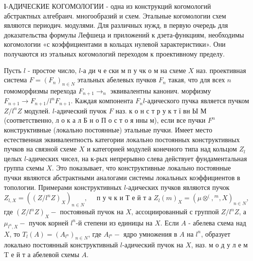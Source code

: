 \documentclass[10pt]{article}
\begin{document}
$\boldsymbol{l}$-АДИЧЕСКИЕ КОГОМОЛОГИИ - одна из конструкций когомологий абстрактных алгебраич. многообразий и схем. Этальные когомологии схем являются периодич. модулями. Для различных нужд, в первую очередь для доказательства формулы Лефшеца и приложений к дзета-функциям, необходимы когомологии «с коэффициентами в кольцах нулевой характеристики». Они получаются из этальных когомологий переходом к проективному пределу.



Пусть $l$ - простое число, $l$-а ди ч е ски м п у чк о м на схеме $X$ наз. проективная система $F=\left(F_{n}\right)_{n \in N}$ этальных абелевых пучков $F_{n}$ такая, что для всех $n$ гомоморфизмы перехода $F_{n+1} \rightarrow_{n}$ эквивалентны канонич. морфизму $F_{n+1} \rightarrow F_{n+1} / l^{n} F_{n+1}$. Каждая компонента $F_{n} l$-адического пучка является пучком $Z / l^{n} Z$ модулей. $l$-адический пучок $F$ наз. к о н с т р у к т ї вн Ы М (соответственно, л о к а л Б н о П о с т о я нны м), если все пучки $F^{n}$ конструктивные (локально постоянные) этальные пучки. Имеет место естественная эквивалентность категории локально постоянных конструктивных пучков на связной схеме $X$ и категорией модулей конечного типа над кольцом $Z_{l}$ целых $l$-адических чисел, на к-рых непрерывно слева действует фундаментальная группа схемы $X$. Это показывает, что конструктивные локально постоянные пучки являются абстрактными аналогами системы локальных коэффициентов в топологии. Примерами конструктивных $l$-адических пучков являются пучок $Z_{l, X}=\left(\left(Z / l^{n} Z\right)_{X}\right)_{n \in N}, \quad$ п у ч к и Т е й т а $Z_{l}(m)_{X}=\left(\mu \otimes^{(},{ }^{m}, X\right)_{n \in N}$, где $\left(Z / l^{n} Z\right)_{X}-$ постоянный пучок на $X$, ассоциированный с группой $Z / l^{n} Z$, а $\mu_{l^{n}, X}-$ пучок корней $l^{n}$-й степени из единицы на $X$. Если $A$ - абелева схема над $X$, то $T_{l}(A)=\left(A_{l^{n}}\right)_{n \in N}$, где $A_{l^{n}}-$ ядро умножения в $A$ на $l^{n}$, образует локально постоянный конструктивный $l$-адический пучок на $X$, наз. м о д у л е м $\mathrm{T}$ е й т а абелевой схемы $A$.
\end{document}
